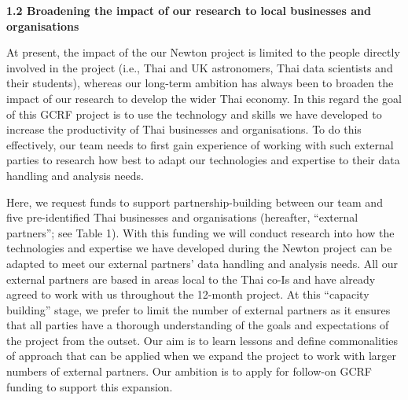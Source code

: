 \documentclass[11pt]{article}
\begin{document}
\vspace{3mm}
\noindent
{\large \bf 1.2 Broadening the impact of our research to local businesses and organisations}

\noindent
At present, the impact of the our Newton project is limited to the people directly involved in the project (i.e., Thai and UK astronomers, Thai data scientists and their students), whereas our long-term ambition has always been to broaden the impact of our research to develop the wider Thai economy. In this regard the goal of this GCRF project is to use the technology and skills we have developed to increase the productivity of Thai businesses and organisations. To do this effectively, our team needs to first gain experience of working with such external parties to research how best to adapt our technologies and expertise to their data handling and analysis needs.  

\vspace{2mm}
\noindent
Here, we request funds to support partnership-building between our team and five pre-identified Thai businesses and organisations (hereafter, ``external partners''; see Table 1). With this funding we will conduct research into how the technologies and expertise we have developed during the Newton project can be adapted to meet our external partners' data handling and analysis needs. All our external partners are based in areas local to the Thai co-Is and have already agreed to work with us throughout the 12-month project. At this ``capacity building'' stage, we prefer to limit the number of external partners as it ensures that all parties have a thorough understanding of the goals and expectations of the project from the outset. Our aim is to learn lessons and define commonalities of approach that can be applied when we expand the project to work with larger numbers of external partners. Our ambition is to apply for follow-on GCRF funding to support this expansion.
\end{document}
